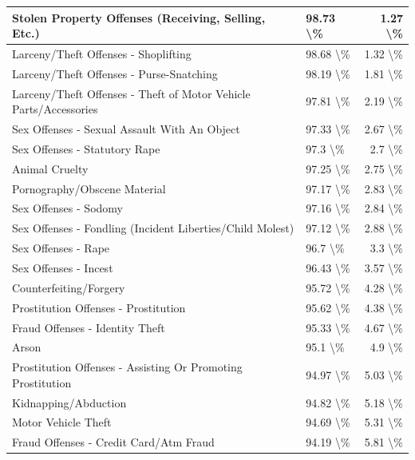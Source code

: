 \documentclass[
]{krantz}
\begin{document}
\begin{longtable}[t]{l|l|r}
\hline
Stolen Property Offenses (Receiving, Selling, Etc.) & 98.73 \textbackslash{}\% & 1.27 \textbackslash{}\%\\
\hline
Larceny/Theft Offenses - Shoplifting & 98.68 \textbackslash{}\% & 1.32 \textbackslash{}\%\\
\hline
Larceny/Theft Offenses - Purse-Snatching & 98.19 \textbackslash{}\% & 1.81 \textbackslash{}\%\\
\hline
Larceny/Theft Offenses - Theft of Motor Vehicle Parts/Accessories & 97.81 \textbackslash{}\% & 2.19 \textbackslash{}\%\\
\hline
Sex Offenses - Sexual Assault With An Object & 97.33 \textbackslash{}\% & 2.67 \textbackslash{}\%\\
\hline
Sex Offenses - Statutory Rape & 97.3 \textbackslash{}\% & 2.7 \textbackslash{}\%\\
\hline
Animal Cruelty & 97.25 \textbackslash{}\% & 2.75 \textbackslash{}\%\\
\hline
Pornography/Obscene Material & 97.17 \textbackslash{}\% & 2.83 \textbackslash{}\%\\
\hline
Sex Offenses - Sodomy & 97.16 \textbackslash{}\% & 2.84 \textbackslash{}\%\\
\hline
Sex Offenses - Fondling (Incident Liberties/Child Molest) & 97.12 \textbackslash{}\% & 2.88 \textbackslash{}\%\\
\hline
Sex Offenses - Rape & 96.7 \textbackslash{}\% & 3.3 \textbackslash{}\%\\
\hline
Sex Offenses - Incest & 96.43 \textbackslash{}\% & 3.57 \textbackslash{}\%\\
\hline
Counterfeiting/Forgery & 95.72 \textbackslash{}\% & 4.28 \textbackslash{}\%\\
\hline
Prostitution Offenses - Prostitution & 95.62 \textbackslash{}\% & 4.38 \textbackslash{}\%\\
\hline
Fraud Offenses - Identity Theft & 95.33 \textbackslash{}\% & 4.67 \textbackslash{}\%\\
\hline
Arson & 95.1 \textbackslash{}\% & 4.9 \textbackslash{}\%\\
\hline
Prostitution Offenses - Assisting Or Promoting Prostitution & 94.97 \textbackslash{}\% & 5.03 \textbackslash{}\%\\
\hline
Kidnapping/Abduction & 94.82 \textbackslash{}\% & 5.18 \textbackslash{}\%\\
\hline
Motor Vehicle Theft & 94.69 \textbackslash{}\% & 5.31 \textbackslash{}\%\\
\hline
Fraud Offenses - Credit Card/Atm Fraud & 94.19 \textbackslash{}\% & 5.81 \textbackslash{}\%\\

\end{longtable}
\end{document}
